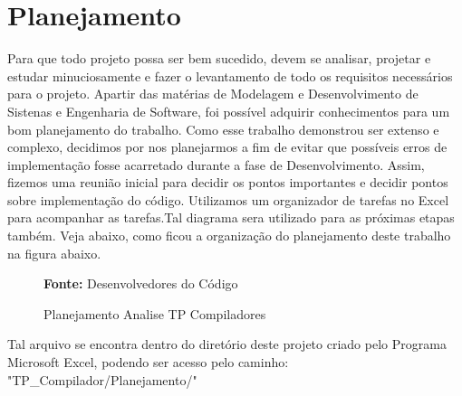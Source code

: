 \chapter{Planejamento}
Para que todo projeto possa ser bem sucedido, devem se analisar, projetar e estudar minuciosamente e fazer o levantamento de todo os requisitos necessários para o projeto.
Apartir das matérias de Modelagem e Desenvolvimento de Sistenas e Engenharia de Software, foi possível adquirir conhecimentos para um bom planejamento do trabalho.
Como esse trabalho demonstrou ser extenso e complexo, decidimos por nos planejarmos a fim de evitar que possíveis erros de implementação fosse acarretado durante a fase de Desenvolvimento.
Assim, fizemos uma reunião inicial para decidir os pontos importantes e decidir pontos sobre implementação do código.
Utilizamos um organizador de tarefas no Excel para acompanhar as tarefas.Tal diagrama sera utilizado para as próximas etapas também.
Veja abaixo, como ficou a organização do planejamento deste trabalho na figura abaixo.

\begin{figure}[H]
    \vspace{1.0em}
    \centering
    \caption{Planejamento Analise TP Compiladores}
 
    \hspace{\linewidth}%
    \textbf{Fonte:} Desenvolvedores do Código
    \label{fig:cefets}
    \vspace{1.0em}
\end{figure}
Tal arquivo se encontra dentro do diretório deste projeto criado pelo Programa Microsoft Excel, podendo ser acesso pelo caminho: "TP{\_}Compilador/Planejamento/"